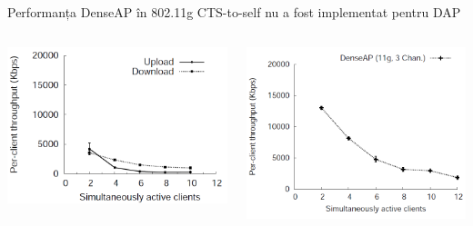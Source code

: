 \begin{frame}{Performanța DenseAP în 802.11g}
  CTS-to-self nu a fost implementat pentru DAP
  \begin{columns}
  \begin{column}{0.5\linewidth}
    \includegraphics[scale=0.22]{img/fig9.png}
  \end{column}
  \begin{column}{0.5\linewidth}
    \includegraphics[scale=0.23]{img/fig11.png}
  \end{column}
  \end{columns}
\end{frame}

